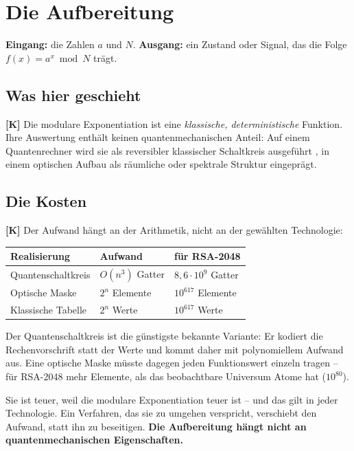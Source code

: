 \section{Die Aufbereitung}
\label{sec:aufbereitung}

\textbf{Eingang:} die Zahlen $a$ und $N$.
\textbf{Ausgang:} ein Zustand oder Signal, das die Folge
$f(x) = a^x \bmod N$ trägt.

\subsection{Was hier geschieht}

\textbf{[K]} Die modulare Exponentiation ist eine \emph{klassische,
deterministische} Funktion. Ihre Auswertung enthält keinen
quantenmechanischen Anteil: Auf einem Quantenrechner wird sie als
reversibler klassischer Schaltkreis ausgeführt \cite{Vedral1996}, in einem
optischen Aufbau als räumliche oder spektrale Struktur eingeprägt.

\subsection{Die Kosten}

\textbf{[K]} Der Aufwand hängt an der Arithmetik, nicht an der
gewählten Technologie:

\begin{center}
\begin{tabular}{lll}
\toprule
Realisierung & Aufwand & für RSA-2048 \\
\midrule
Quantenschaltkreis & $O(n^3)$ Gatter & $8{,}6\cdot10^{9}$ Gatter \\
Optische Maske & $2^n$ Elemente & $10^{617}$ Elemente \\
Klassische Tabelle & $2^n$ Werte & $10^{617}$ Werte \\
\bottomrule
\end{tabular}
\end{center}

Der Quantenschaltkreis ist die günstigste bekannte Variante: Er
kodiert die Rechenvorschrift statt der Werte und kommt daher mit
polynomiellem Aufwand aus. Eine optische Maske müsste dagegen jeden
Funktionswert einzeln tragen -- für RSA-2048 mehr Elemente, als das
beobachtbare Universum Atome hat ($10^{80}$).

\begin{keyresult}
Sie ist teuer, weil die modulare Exponentiation teuer ist -- und das
gilt in jeder Technologie. Ein Verfahren, das sie zu umgehen
verspricht, verschiebt den Aufwand, statt ihn zu beseitigen.
\textbf{Die Aufbereitung hängt nicht an quantenmechanischen
Eigenschaften.}
\end{keyresult}

